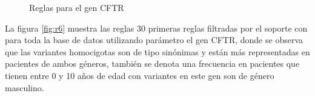 \begin{figure}[]
	\centering
	\caption{Reglas para el gen CFTR} 
\end{figure}

La figura \ref{fig:r6} muestra las reglas 30 primeras reglas filtradas por el soporte con para toda la base de datos utilizando parámetro el gen CFTR, donde se observa que las variantes homocigotas son de tipo sinónimas y están más representadas en pacientes de ambos géneros, también se denota una frecuencia en pacientes que tienen entre 0 y 10 años de edad con variantes en este gen son de género masculino. \\

